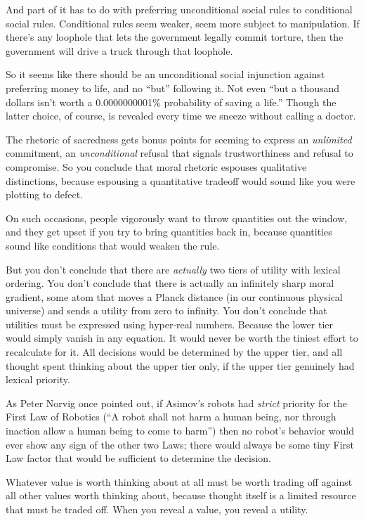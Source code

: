 {
 And part of it has to do with preferring unconditional social
rules to conditional social rules. Conditional rules seem weaker, seem
more subject to manipulation. If there's any loophole
that lets the government legally commit torture, then the government
will drive a truck through that loophole.}

{
 So it seems like there should be an unconditional social
injunction against preferring money to life, and no
``but'' following it. Not even
``but a thousand dollars isn't worth a
0.0000000001\% probability of saving a life.'' Though
the latter choice, of course, is revealed every time we sneeze without
calling a doctor.}

{
 The rhetoric of sacredness gets bonus points for seeming to
express an \textit{unlimited} commitment, an \textit{unconditional}
refusal that signals trustworthiness and refusal to compromise. So you
conclude that moral rhetoric espouses qualitative distinctions, because
espousing a quantitative tradeoff would sound like you were plotting to
defect.}

{
 On such occasions, people vigorously want to throw quantities out
the window, and they get upset if you try to bring quantities back in,
because quantities sound like conditions that would weaken the rule.}

{
 But you don't conclude that there are
\textit{actually} two tiers of utility with lexical ordering. You
don't conclude that there is actually an infinitely
sharp moral gradient, some atom that moves a Planck distance (in our
continuous physical universe) and sends a utility from zero to
infinity. You don't conclude that utilities must be
expressed using hyper-real numbers. Because the lower tier would simply
vanish in any equation. It would never be worth the tiniest effort to
recalculate for it. All decisions would be determined by the upper
tier, and all thought spent thinking about the upper tier only, if the
upper tier genuinely had lexical priority.}

{
 As Peter Norvig once pointed out, if Asimov's
robots had \textit{strict} priority for the First Law of Robotics
(``A robot shall not harm a human being, nor through
inaction allow a human being to come to harm'') then
no robot's behavior would ever show any sign of the
other two Laws; there would always be some tiny First Law factor that
would be sufficient to determine the decision.}

{
 Whatever value is worth thinking about at all must be worth
trading off against all other values worth thinking about, because
thought itself is a limited resource that must be traded off. When you
reveal a value, you reveal a utility.}

